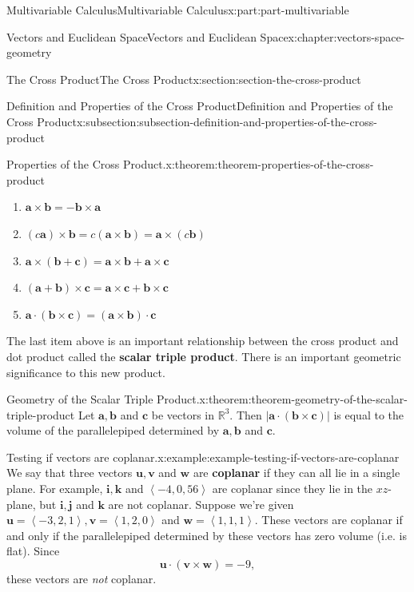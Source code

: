 \documentclass[twoside,10pt,]{book}
\newcommand{\terminology}[1]{\textbf{#1}}
\numberwithin{equation}{part}
\newcommand{\RR}{\mathbb{R}}
\newcommand{\dotprod}[1]{\left\langle #1 \right\rangle}
\begin{document}
\begin{partptx}{Multivariable Calculus}{}{Multivariable Calculus}{}{}{x:part:part-multivariable}
\begin{chapterptx}{Vectors and Euclidean Space}{}{Vectors and Euclidean Space}{}{}{x:chapter:vectors-space-geometry}
\begin{sectionptx}{The Cross Product}{}{The Cross Product}{}{}{x:section:section-the-cross-product}
\begin{subsectionptx}{Definition and Properties of the Cross Product}{}{Definition and Properties of the Cross Product}{}{}{x:subsection:subsection-definition-and-properties-of-the-cross-product}
\begin{theorem}{Properties of the Cross Product.}{}{x:theorem:theorem-properties-of-the-cross-product}
\begin{multicols}{2}
\begin{enumerate}
\item{}\(\displaystyle \mathbf{a}\times\mathbf{b} = -\mathbf{b}\times\mathbf{a}\)%
\item{}\(\displaystyle (c\mathbf{a})\times\mathbf{b} = c(\mathbf{a}\times\mathbf{b}) = \mathbf{a}\times(c\mathbf{b})\)%
\item{}\(\displaystyle \mathbf{a}\times(\mathbf{b}+\mathbf{c}) = \mathbf{a}\times\mathbf{b}+\mathbf{a}\times\mathbf{c}\)%
\item{}\(\displaystyle (\mathbf{a}+\mathbf{b})\times\mathbf{c} = \mathbf{a}\times\mathbf{c}+\mathbf{b}\times\mathbf{c}\)%
\item{}\(\displaystyle \mathbf{a}\cdot(\mathbf{b}\times\mathbf{c}) = (\mathbf{a}\times\mathbf{b})\cdot\mathbf{c}\)%
\end{enumerate}
\end{multicols}
\end{theorem}
The last item above is an important relationship between the cross product and dot product called the \terminology{scalar triple product}. There is an important geometric significance to this new product.%
\begin{theorem}{Geometry of the Scalar Triple Product.}{}{x:theorem:theorem-geometry-of-the-scalar-triple-product}%
%
Let \(\mathbf{a},\mathbf{b}\) and \(\mathbf{c}\) be vectors in \(\RR^{3}\). Then \(|\mathbf{a}\cdot(\mathbf{b}\times\mathbf{c})|\) is equal to the volume of the parallelepiped determined by \(\mathbf{a},\mathbf{b}\) and \(\mathbf{c}\).%
\end{theorem}
\begin{example}{Testing if vectors are coplanar.}{x:example:example-testing-if-vectors-are-coplanar}%
We say that three vectors \(\mathbf{u},\mathbf{v}\) and \(\mathbf{w}\) are \terminology{coplanar} if they can all lie in a single plane. For example, \(\mathbf{i},\mathbf{k}\) and \(\dotprod{-4,0,56}\) are coplanar since they lie in the \(xz\)-plane, but \(\mathbf{i},\mathbf{j}\) and \(\mathbf{k}\) are not coplanar. Suppose we're given \(\mathbf{u} = \dotprod{-3,2,1},\mathbf{v} = \dotprod{1,2,0}\) and \(\mathbf{w} = \dotprod{1,1,1}\). These vectors are coplanar if and only if the parallelepiped determined by these vectors has zero volume (i.e. is flat). Since%
%
\begin{equation*}
\mathbf{u}\cdot(\mathbf{v}\times\mathbf{w}) = -9,
\end{equation*}
these vectors are \emph{not} coplanar.%
\end{example}

\end{subsectionptx}
\end{sectionptx}
\end{chapterptx}
\end{partptx}
\end{document}
